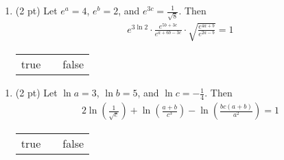 \spaceSolution{0.5in}{%
}%






\begin{enumerate}[resume,label=(\alph*)]
\item\label{itm : Exam4P1Q1d} (2 pt) Let $e^{a} = 4$, $e^{b} = 2$, and $e^{3 c} = \frac{1}{\sqrt{8}}$. Then
\begin{align*}
e^{3 \ln 2} \cdot \frac{e^{5 b + 3 c}}{e^{a + 6 b - 3 c}} \cdot \sqrt{\frac{e^{4 a + b}}{e^{2 a - b}}}
=
1
\end{align*}
\begin{center}
\begin{tabular}{c c c}
true	&	\hspace{1in}	&	false
\end{tabular}
\end{center}
\end{enumerate}

\spaceSolution{0.5in}{%
}%



\begin{enumerate}[resume,label=(\alph*)]
\item\label{itm : Exam4P1Q1e} (2 pt) Let $\ln a = 3$, $\ln b = 5$, and $\ln c = -\frac{1}{4}$. Then
\begin{align*}
2 \ln\left(\frac{1}{\sqrt{e}}\right) + \ln\left(\frac{a + b}{c^{3}}\right) - \ln\left(\frac{b c (a + b)}{a^{2}}\right)
=
1
\end{align*}
\begin{center}
\begin{tabular}{c c c}
true	&	\hspace{1in}	&	false
\end{tabular}
\end{center}
\end{enumerate}

\spaceSolution{0.5in}{%
}%





